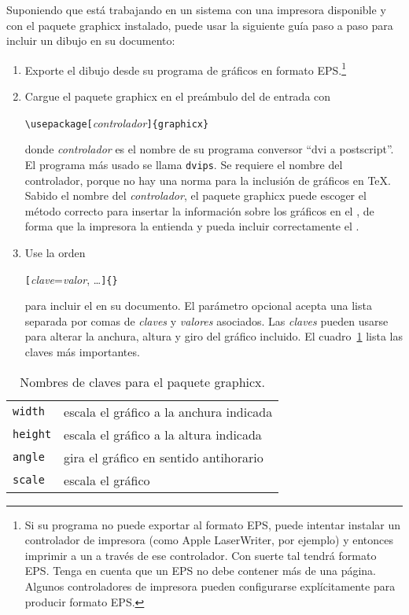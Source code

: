 Suponiendo que está trabajando en un sistema con una impresora \PSi{} disponible y con el paquete \textsf{graphicx} instalado, puede usar la siguiente guía paso a paso para incluir un dibujo en su documento:

\begin{enumerate}
    \item Exporte el dibujo desde su programa de gráficos en formato EPS.\footnote{Si su programa no puede exportar al formato EPS, puede intentar instalar un controlador de impresora \PSi{} (como Apple LaserWriter, por ejemplo) y entonces imprimir a un \filenomo{} a través de ese controlador.  Con suerte tal \filenomo{} tendrá formato EPS.  Tenga en cuenta que un EPS no debe contener más de una página.  Algunos controladores de impresora pueden configurarse explícitamente para producir formato EPS.}
    \item Cargue el paquete \textsf{graphicx} en el preámbulo del \filenomo{} de entrada con
    \begin{lscommand}
    \verb|\usepackage[|\emph{controlador}\verb|]{graphicx}|
    \end{lscommand}
    donde \emph{controlador} es el nombre de su programa conversor ``dvi a post\-script''.  El programa más usado se llama \texttt{dvips}.  Se requiere el nombre del controlador, porque no hay una norma para la inclusión de gráficos en \TeX{}.  Sabido el nombre del \emph{controlador}, el paquete \textsf{graphicx} puede escoger el método correcto para insertar la información sobre los gráficos en el \filenomo{} , de forma que la impresora la entienda y pueda incluir correctamente el \filenomo{} .
    \item Use la orden
    \begin{lscommand}
    \verb|[|\emph{clave}=\emph{valor}, \ldots\verb|]{|\emph{\filenomo{}}\verb|}|
    \end{lscommand}
    para incluir el \emph{\filenomo{}} en su documento.  El parámetro opcional acepta una lista separada por comas de \emph{claves} y \emph{valores} asociados.  Las \emph{claves} pueden usarse para alterar la anchura, altura y giro del gráfico incluido.  El cuadro~\ref{keyvals} lista las claves más importantes.
\end{enumerate}

\begin{table}[htb]
    \caption{Nombres de claves para el paquete \textsf{graphicx}.}
    \label{keyvals}
    \begin{lined}{9cm}
        \begin{tabular}{@{}ll}
            \texttt{width}& escala el gráfico a la anchura indicada\\
            \texttt{height}& escala el gráfico a la altura indicada\\
            \texttt{angle}& gira el gráfico en sentido antihorario\\
            \texttt{scale}& escala el gráfico \\
        \end{tabular}

        \bigskip
    \end{lined}
\end{table}

